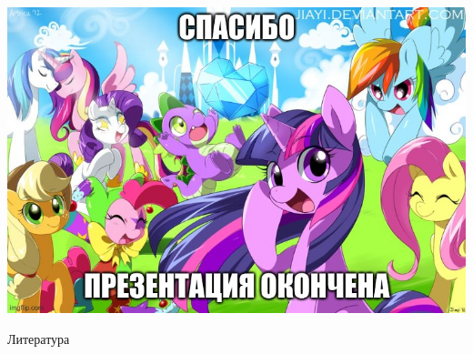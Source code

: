 \documentclass[11pt,aspectratio=169,handout]{beamer}
\begin{document}
\begin{frame}

\begin{center}
\includegraphics[scale=0.4]{images/thankyou.jpeg}

\end{center}

\end{frame}

\begin{frame}[allowframebreaks]{Литература}




\end{frame}
\end{document}
